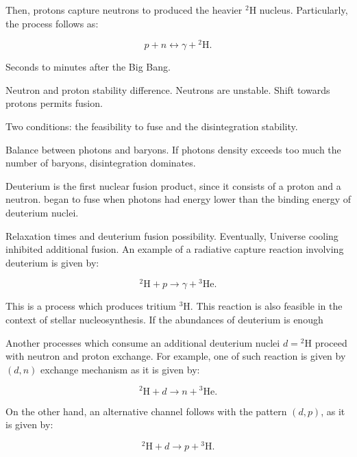 \documentclass[openany]{book}
\begin{document}
Then, protons capture neutrons to produced the heavier $\mathrm{{}^{2}H}$ nucleus. Particularly, the process follows as:

\begin{equation} \label{eq:reaction_BBN_pn}
	p + n \leftrightarrow \gamma + \mathrm{{}^{2}H}.
\end{equation}

Seconds to minutes after the Big Bang. 

Neutron and proton stability difference. Neutrons are unstable.  Shift towards protons permits fusion. 

Two conditions: the feasibility to fuse and the disintegration stability.

Balance between photons and baryons. If photons density exceeds too much the number of baryons, disintegration dominates. 

Deuterium is the first nuclear fusion product, since it  consists of a proton and a neutron. began to fuse when photons had  energy lower than the binding energy of deuterium nuclei. 

Relaxation times and deuterium fusion possibility. Eventually, Universe cooling inhibited additional fusion. An example of a radiative capture reaction involving deuterium is given by:

\begin{equation} \label{eq:reaction_2Hpradiative}
	\mathrm{{}^{2}H} + p \rightarrow \gamma + \mathrm{{}^{3}He}.
\end{equation}

This is a process which produces tritium $\mathrm{{}^{3}H}$. This reaction is also feasible in the context of stellar nucleosynthesis. If the abundances of deuterium  is enough 

Another processes which consume an additional deuterium nuclei $d = \mathrm{{}^{2}H}$ proceed with neutron and proton exchange. For example, one of such reaction is given by $(d, n)$ exchange mechanism as it is given by: 

\begin{equation} \label{eq:reaction_2Hdn}
	\mathrm{{}^{2}H} + d \rightarrow n + \mathrm{{}^{3}He}.
\end{equation}

On the other hand, an alternative channel follows with the pattern $(d, p)$, as it is given by: 

\begin{equation} \label{eq:reaction_2Hdp}
	\mathrm{{}^{2}H} + d \rightarrow p + \mathrm{{}^{3}H}.
\end{equation}
 
\end{document}
